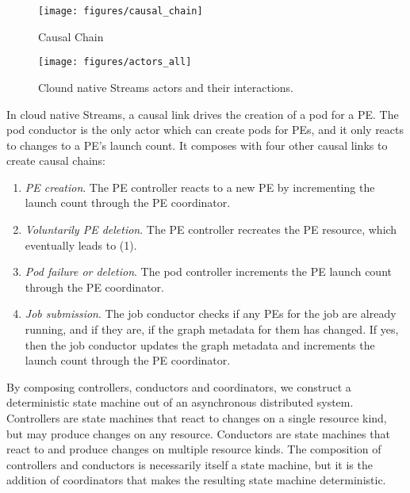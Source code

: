 \begin{figure}[h]
  \centering
  \texttt{[image: figures/causal\_chain]}
  \caption{Causal Chain}
  \label{fig:causal_chain}
\end{figure}

\begin{figure*}[t!]
  \centering
  \texttt{[image: figures/actors\_all]}
  \caption{Clound native Streams actors and their interactions.}
  \label{fig:actors}
\end{figure*}

In cloud native Streams, a causal link drives the creation of a pod for a PE.
The pod conductor is the only actor which can create pods for PEs, and it only 
reacts to changes to a PE's launch count. It composes with four other causal 
links to create causal chains:

\begin{enumerate}
    \item \emph{PE creation}. The PE controller reacts to a new PE by incrementing 
        the launch count through the PE coordinator.
    \item \emph{Voluntarily PE deletion}. The PE controller recreates the PE resource, 
        which eventually leads to (1).
    \item \emph{Pod failure or deletion}. The pod controller increments the PE 
        launch count through the PE coordinator.
    \item \emph{Job submission}. The job conductor checks if any PEs for the job are 
        already running, and if they are, if the graph metadata for them has 
        changed. If yes, then the job conductor updates the graph metadata and 
        increments the launch count through the PE coordinator.
\end{enumerate}

By composing controllers, conductors and coordinators, we construct a
deterministic state machine out of an asynchronous distributed system.
Controllers are state machines that react to changes on a single resource kind,
but may produce changes on any resource. Conductors are state machines that
react to and produce changes on multiple resource kinds.  The composition of
controllers and conductors is necessarily itself a state machine, but it is the
addition of coordinators that makes the resulting state machine deterministic.

